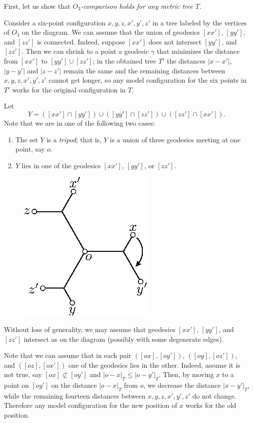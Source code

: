 \documentclass{article}
\begin{document}
\bigskip

First, let us show that \textit{$O_3$-comparison holds for any metric tree $T$.}

Consider a six-point configuration $x,y,z,x',y',z'$ in a tree labeled by the vertices of $O_3$ on the diagram.
We can assume that the union of geodesics $[xx']$, $[yy']$, and $[zz']$ is connected.
Indeed, suppose $[xx']$ does not intersect $[yy']$, and $[zz']$.
Then we can shrink to a point a geodesic $\gamma$ that minimizes the distance from $[xx']$ to $[yy']\cup[zz']$;
in the obtained tree $T'$ the distances $|x-x'|$, $|y-y'|$ and $|z-z'|$ remain the same and the remaining distances between $x,y,z,x',y',z'$ cannot get longer, so any model configuration for the six points in $T'$ works for the original configuration in $T$.

Let 
\[Y=([xx']\cap [yy'])\cup([yy']\cap [zz'])\cup([zz']\cap [xx']).\]
Note that we are in one of the following two cases:
\begin{enumerate}
\item The set $Y$ is a \emph{tripod}; that is, $Y$ is a union of three geodesics meeting at one point, say $o$.
\item $Y$ lies in one of the  geodesics $[xx']$, $[yy']$, or $[zz']$.
\end{enumerate}

\begin{figure}
\vskip-6mm
\centering
\includegraphics{mppics/pic-40}
\end{figure}

Without loss of generality, we may assume that geodesics $[xx']$, $[yy']$, and $[zz']$ intersect as on the diagram (possibly with some degenerate edges).

Note that we can assume that in each pair $([ox],[oy'])$, $([oy],[oz'])$, and $([oz],[ox'])$ one of the geodesics lies in the other.
Indeed, assume it is not true, say $[ox]\not\subset[oy']$ and $|o-x|_T\le |o-y'|_T$.
Then, by moving $x$ to a point on $[oy']$ on the distance $|o-x|_T$ from $o$, we decrease the distance $|x-y'|_T$, while the remaining fourteen distances between $x,y,z,x',y',z'$ do not change.
Therefore any model configuration for the new position of $x$ works for the old position.
\end{document}
